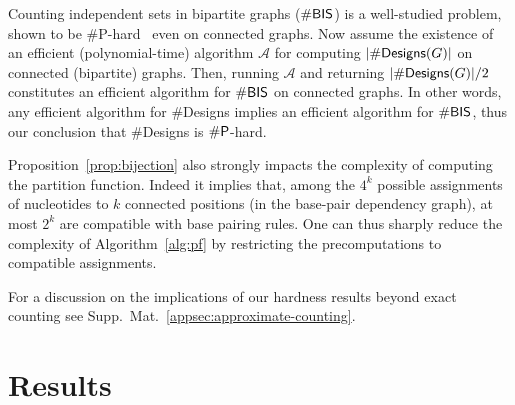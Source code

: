 \documentclass[]{bmcart}
\newenvironment{proof}[1][]{\noindent Proof\ifthenelse{\equal{#1}{}}{}{ (#1)}.~}{}
\newcommand{\Design}[1]{{\sf Designs}^{\star}(#1)}
\newcommand{\NumDesign}{\ensuremath{\#}{\sf Designs}\xspace}
\newcommand{\IS}[1]{{\sf IndSets}(#1)}
\newcommand{\citep}[1]{\cite{#1}}
\newcommand{\revised}[1]{{\color{red} #1}}
\begin{document}
Counting independent sets in bipartite graphs ($\#{\sf BIS}$) is a well-studied problem, shown to be \#{\sf P}-hard~\citep{Ge2012} even on connected graphs. Now assume the existence of an efficient (polynomial-time) algorithm $\mathcal{A}$ for computing $|\NumDesign(G)|$ on connected (bipartite) graphs. Then, running $\mathcal{A}$ and returning $|\NumDesign(G)|/2$ constitutes an efficient algorithm for $\#{\sf BIS}$ on connected graphs.
In other words, any efficient algorithm for \NumDesign implies an efficient algorithm for $\#{\sf BIS}$, thus our conclusion that \NumDesign is $\#{\sf P}$-hard. 

\revised{Proposition~\ref{prop:bijection} also strongly impacts the complexity of computing the partition function. Indeed it implies that, among the $4^k$ possible assignments of nucleotides to $k$ connected positions (in the base-pair dependency graph), at most $2^k$ are compatible with base pairing rules. One can thus sharply reduce the complexity of Algorithm~\ref{alg:pf} by restricting the precomputations to compatible assignments.

For a discussion on the implications of our hardness results beyond exact counting see Supp.\ Mat.~\ref{appsec:approximate-counting}.
}






\section*{Results}\label{sec:results}
\end{document}
